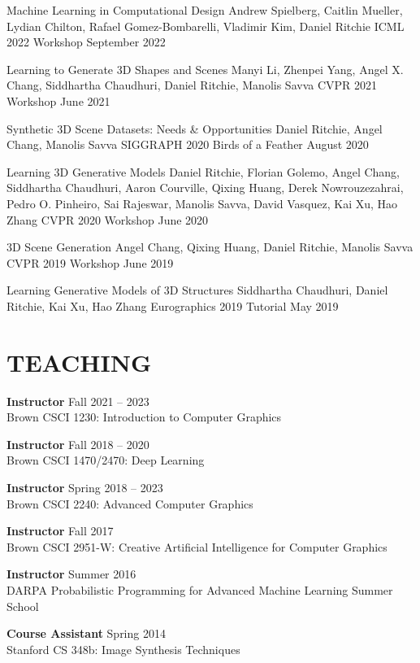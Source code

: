 \documentclass[line,margin]{res}
\begin{document}
\begin{resume}
\workshop
{Machine Learning in Computational Design}
{Andrew Spielberg, Caitlin Mueller, Lydian Chilton, Rafael Gomez-Bombarelli, Vladimir Kim, Daniel Ritchie}
{ICML 2022 Workshop}
{September 2022}

\workshop
{Learning to Generate 3D Shapes and Scenes}
{Manyi Li, Zhenpei Yang, Angel X. Chang, Siddhartha Chaudhuri, Daniel Ritchie, Manolis Savva}
{CVPR 2021 Workshop}
{June 2021}

\workshop
{Synthetic 3D Scene Datasets: Needs \& Opportunities}
{Daniel Ritchie, Angel Chang, Manolis Savva}
{SIGGRAPH 2020 Birds of a Feather}
{August 2020}

\workshop
{Learning 3D Generative Models}
{Daniel Ritchie, Florian Golemo, Angel Chang, Siddhartha Chaudhuri, Aaron Courville, Qixing Huang, Derek Nowrouzezahrai, Pedro O. Pinheiro, Sai Rajeswar, Manolis Savva, David Vasquez, Kai Xu, Hao Zhang}
{CVPR 2020 Workshop}
{June 2020}

\workshop
{3D Scene Generation}
{Angel Chang, Qixing Huang, Daniel Ritchie, Manolis Savva}
{CVPR 2019 Workshop}
{June 2019}

\tutorial
{Learning Generative Models of 3D Structures}
{Siddhartha Chaudhuri, Daniel Ritchie, Kai Xu, Hao Zhang}
{Eurographics 2019 Tutorial}
{May 2019}


\section{TEACHING}

\newcommand{\teach}[3] {
	\textbf{#1} \hfill #3\\
	#2
}

\teach
{Instructor}
{Brown CSCI 1230: Introduction to Computer Graphics}
{Fall 2021 -- 2023}

\teach
{Instructor}
{Brown CSCI 1470/2470: Deep Learning}
{Fall 2018 -- 2020}

\teach
{Instructor}
{Brown CSCI 2240: Advanced Computer Graphics}
{Spring 2018 -- 2023}

\teach
{Instructor}
{Brown CSCI 2951-W: Creative Artificial Intelligence for Computer Graphics}
{Fall 2017}

\teach
{Instructor}
{DARPA Probabilistic Programming for Advanced Machine Learning Summer School}
{Summer 2016}

\teach
{Course Assistant}
{Stanford CS 348b: Image Synthesis Techniques}
{Spring 2014}


\end{resume}
\end{document}
